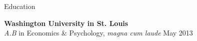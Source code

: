 \begin{rSection}{\textrm{Education}}
\begin{comment}
Summer Scholar\hfill{Summer 2014}\\
\hspace*{\pindent}Interuniversity Consortium for Political and Social Research\medskip\\\end{comment}
{\bf Washington University in St. Louis}\\
{\em A.B} in Economics \& Psychology, \textit{magna cum laude} \hfill{May 2013}%
\end{rSection}